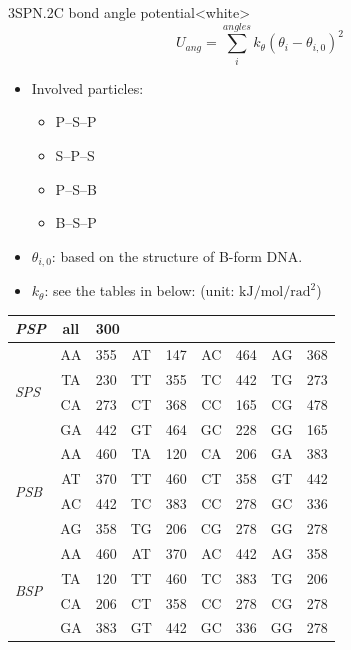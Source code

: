 \begin{smallpage}{3SPN.2C bond angle potential}<white>
  \begin{equation}
    \label{eq:dna_3spn2c_local_angle}
    U_{ang} = \sum_{i}^{angles} k_\theta (\theta_i - \theta_{i,0})^2
  \end{equation}
  \tcblower
  \begin{itemize}
  \item Involved particles:
    \begin{itemize}
    \item P--S--P
    \item S--P--S
    \item P--S--B
    \item B--S--P
    \end{itemize}
  \item $\theta_{i, 0}$: based on the structure of B-form DNA.
  \item $k_\theta$: see the tables in below: (unit: $\mathrm{kJ/mol/rad^2}$) 
  \end{itemize}
  \begin{center}
    \begin{tabular}{l|cl|cl|cl|cl}
      \toprule
      \emph{PSP} & all & \multicolumn{7}{l}{300}\\
      \midrule
      \multirow{4}{*}{\emph{SPS}} &
      AA & 355 & AT & 147 & AC & 464 & AG & 368 \\
      & TA & 230 & TT & 355 & TC & 442 & TG & 273 \\
      & CA & 273 & CT & 368 & CC & 165 & CG & 478 \\
      & GA & 442 & GT & 464 & GC & 228 & GG & 165 \\
      \midrule
      \multirow{4}{*}{\emph{PSB}} &
      AA & 460 & TA & 120 & CA & 206 & GA & 383 \\
      & AT & 370 & TT & 460 & CT & 358 & GT & 442 \\
      & AC & 442 & TC & 383 & CC & 278 & GC & 336 \\
      & AG & 358 & TG & 206 & CG & 278 & GG & 278 \\
      \midrule
      \multirow{4}{*}{\emph{BSP}} &
      AA & 460 & AT & 370 & AC & 442 & AG & 358 \\
      & TA & 120 & TT & 460 & TC & 383 & TG & 206 \\
      & CA & 206 & CT & 358 & CC & 278 & CG & 278 \\
      & GA & 383 & GT & 442 & GC & 336 & GG & 278 \\
      \bottomrule
    \end{tabular}
  \end{center}
\end{smallpage}
